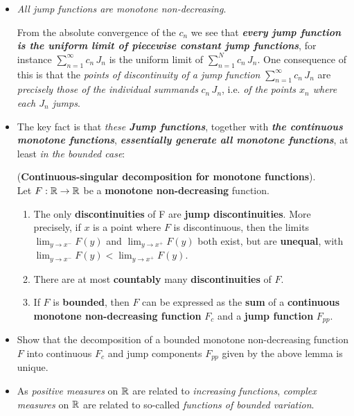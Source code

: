 \documentclass[11pt]{article}
\begin{document}
\begin{itemize}
\item \begin{remark}
\emph{All jump functions are monotone non-decreasing}.  

From the absolute convergence of the $c_n$ we see that \emph{\textbf{every jump function is the uniform limit of piecewise constant jump functions}}, for instance
$\sum_{n=1}^{\infty}c_n\,J_n$ is the uniform limit of $\sum_{n=1}^{N}c_n\,J_n$. One consequence of this is that the \emph{points of discontinuity of a jump function} $\sum_{n=1}^{\infty}c_n\,J_n$ are \emph{precisely those of the individual summands} $c_n\,J_n$, i.e. \emph{of the points $x_n$ where each $J_n$ jumps}.
\end{remark}

\item The key fact is that \emph{these \textbf{Jump functions}}, together with \emph{\textbf{the continuous monotone functions}}, \emph{\textbf{essentially generate all monotone functions}}, at least \emph{in the bounded case}:
\begin{lemma} (\textbf{Continuous-singular decomposition for monotone functions}). \\
Let $F : {\mathbb R} \rightarrow {\mathbb R}$ be a \textbf{monotone non-decreasing} function.
\begin{enumerate}
\item The only \textbf{discontinuities} of F are \textbf{jump discontinuities}. More precisely, if $x$ is a point where $F$ is discontinuous, then the
limits $\lim_{y\rightarrow x^{-}}F (y)$ and $\lim_{y\rightarrow x^{+}}F (y)$ both exist, but are \textbf{unequal}, with $\lim_{y\rightarrow x^{-}}F (y) < \lim_{y\rightarrow x^{+}}F (y)$.
\item There are at most \textbf{countably} many \textbf{discontinuities} of $F$.
\item If $F$ is \textbf{bounded}, then $F$ can be expressed as the \textbf{sum} of a \textbf{continuous} \textbf{monotone non-decreasing function} $F_c$ and a \textbf{jump function} $F_{pp}$.
\end{enumerate}
\end{lemma}

\item \begin{exercise}
Show that the decomposition of a bounded monotone non-decreasing function $F$ into continuous $F_c$ and jump components $F_{pp}$ given by the above lemma is unique.
\end{exercise}

\item \begin{remark}
As \emph{positive measures} on ${\mathbb R}$ are related to \emph{increasing functions}, \emph{complex measures} on ${\mathbb R}$ are related to so-called \emph{functions of bounded variation}. 
\end{remark}


\end{itemize}
\end{document}
